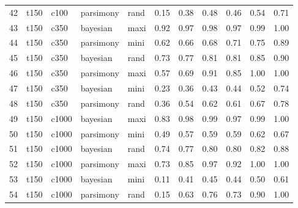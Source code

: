 \documentclass[12pt,letterpaper]{article}
\begin{document}
\begin{longtable}{rllllrrrrrr}
  42 & t150 & c100 & parsimony & rand & 0.15 & 0.38 & 0.48 & 0.46 & 0.54 & 0.71 \\ 
  43 & t150 & c350 & bayesian & maxi & 0.92 & 0.97 & 0.98 & 0.97 & 0.99 & 1.00 \\ 
  44 & t150 & c350 & parsimony & mini & 0.62 & 0.66 & 0.68 & 0.71 & 0.75 & 0.89 \\ 
  45 & t150 & c350 & bayesian & rand & 0.73 & 0.77 & 0.81 & 0.81 & 0.85 & 0.90 \\ 
  46 & t150 & c350 & parsimony & maxi & 0.57 & 0.69 & 0.91 & 0.85 & 1.00 & 1.00 \\ 
  47 & t150 & c350 & bayesian & mini & 0.23 & 0.36 & 0.43 & 0.44 & 0.52 & 0.74 \\ 
  48 & t150 & c350 & parsimony & rand & 0.36 & 0.54 & 0.62 & 0.61 & 0.67 & 0.78 \\ 
  49 & t150 & c1000 & bayesian & maxi & 0.83 & 0.98 & 0.99 & 0.97 & 0.99 & 1.00 \\ 
  50 & t150 & c1000 & parsimony & mini & 0.49 & 0.57 & 0.59 & 0.59 & 0.62 & 0.67 \\ 
  51 & t150 & c1000 & bayesian & rand & 0.74 & 0.77 & 0.80 & 0.80 & 0.82 & 0.88 \\ 
  52 & t150 & c1000 & parsimony & maxi & 0.73 & 0.85 & 0.97 & 0.92 & 1.00 & 1.00 \\ 
  53 & t150 & c1000 & bayesian & mini & 0.11 & 0.41 & 0.45 & 0.44 & 0.50 & 0.61 \\ 
  54 & t150 & c1000 & parsimony & rand & 0.15 & 0.63 & 0.76 & 0.73 & 0.90 & 1.00 \\ 
   \hline
\end{longtable}
\end{document}
